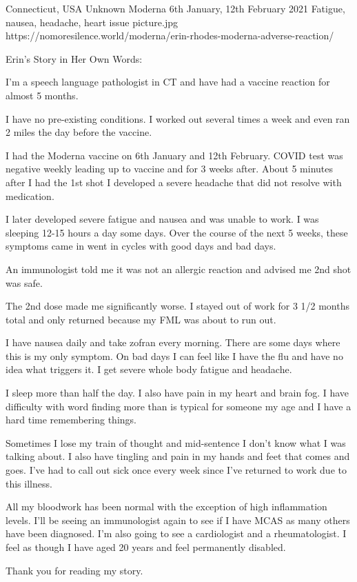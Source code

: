 {Connecticut, USA}
{Unknown}
{Moderna}
{6th January, 12th February 2021}
{Fatigue, nausea, headache, heart issue}
{picture.jpg}
{https://nomoresilence.world/moderna/erin-rhodes-moderna-adverse-reaction/}
{


Erin’s Story in Her Own Words:

I’m a speech language pathologist in CT and have had a vaccine reaction for almost 5 months.

I have no pre-existing conditions. I worked out several times a week and even ran 2 miles the day before the vaccine.

I had the Moderna vaccine on 6th January and 12th February. COVID test was negative weekly leading up to vaccine and for 3 weeks after.
About 5 minutes after I had the 1st shot I developed a severe headache that did not resolve with medication.

I later developed severe fatigue and nausea and was unable to work. I was sleeping 12-15 hours a day some days. Over the course of the next 5 weeks, these symptoms came in went in cycles with good days and bad days.

An immunologist told me it was not an allergic reaction and advised me 2nd shot was safe.

The 2nd dose made me significantly worse. I stayed out of work for 3 1/2 months total and only returned because my FML was about to run out.

I have nausea daily and take zofran every morning. There are some days where this is my only symptom. On bad days I can feel like I have the flu and have no idea what triggers it. I get severe whole body fatigue and headache.

I sleep more than half the day. I also have pain in my heart and brain fog. I have difficulty with word finding more than is typical for someone my age and I have a hard time remembering things.

Sometimes I lose my train of thought and mid-sentence I don’t know what I was talking about. I also have tingling and pain in my hands and feet that comes and goes. I’ve had to call out sick once every week since I’ve returned to work due to this illness.

All my bloodwork has been normal with the exception of high inflammation levels. I’ll be seeing an immunologist again to see if I have MCAS as many others have been diagnosed. I’m also going to see a cardiologist and a rheumatologist. I feel as though I have aged 20 years and feel permanently disabled.

Thank you for reading my story.
}
